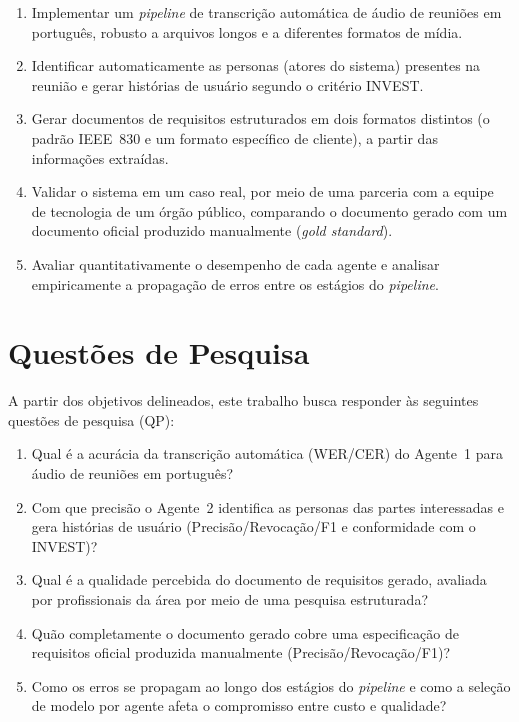 \begin{enumerate}
    \item[1.] Implementar um \textit{pipeline} de transcrição automática de áudio de reuniões em português, robusto a arquivos longos e a diferentes formatos de mídia.
    \item[2.] Identificar automaticamente as personas (atores do sistema) presentes na reunião e gerar histórias de usuário segundo o critério INVEST.
    \item[3.] Gerar documentos de requisitos estruturados em dois formatos distintos (o padrão IEEE~830 e um formato específico de cliente), a partir das informações extraídas.
    \item[4.] Validar o sistema em um caso real, por meio de uma parceria com a equipe de tecnologia de um órgão público, comparando o documento gerado com um documento oficial produzido manualmente (\textit{gold standard}).
    \item[5.] Avaliar quantitativamente o desempenho de cada agente e analisar empiricamente a propagação de erros entre os estágios do \textit{pipeline}.
\end{enumerate}

\section{Questões de Pesquisa}

A partir dos objetivos delineados, este trabalho busca responder às seguintes questões de pesquisa (QP):

\begin{enumerate}
    \item[\textbf{QP1.}] Qual é a acurácia da transcrição automática (WER/CER) do Agente~1 para áudio de reuniões em português?
    \item[\textbf{QP2.}] Com que precisão o Agente~2 identifica as personas das partes interessadas e gera histórias de usuário (Precisão/Revocação/F1 e conformidade com o INVEST)?
    \item[\textbf{QP3.}] Qual é a qualidade percebida do documento de requisitos gerado, avaliada por profissionais da área por meio de uma pesquisa estruturada?
    \item[\textbf{QP4.}] Quão completamente o documento gerado cobre uma especificação de requisitos oficial produzida manualmente (Precisão/Revocação/F1)?
    \item[\textbf{QP5.}] Como os erros se propagam ao longo dos estágios do \textit{pipeline} e como a seleção de modelo por agente afeta o compromisso entre custo e qualidade?
\end{enumerate}

